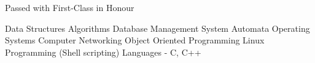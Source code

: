 Passed with First-Class in Honour



Data Structures \textbullet{} Algorithms \textbullet{} Database Management System \textbullet{} Automata \textbullet{} Operating Systems \textbullet{} Computer Networking \textbullet{} Object Oriented Programming \textbullet{} Linux Programming (Shell scripting) \textbullet{} Languages - C, C++